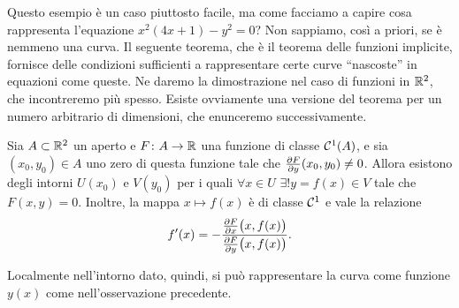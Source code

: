 Questo esempio è un caso piuttosto facile, ma come facciamo a capire cosa rappresenta l'equazione $x^2(4x+1)-y^2=0$?
Non sappiamo, così a priori, se è nemmeno una curva.
Il seguente teorema, che è il teorema delle funzioni implicite, fornisce delle condizioni sufficienti a rappresentare certe curve ``nascoste'' in equazioni come queste.
Ne daremo la dimostrazione nel caso di funzioni in $\mathbb{R}^2$, che incontreremo più spesso.
Esiste ovviamente una versione del teorema per un numero arbitrario di dimensioni, che enunceremo successivamente.
\begin{teorema}[di Dini] \label{t:dini-R2}
	Sia $A\subset\mathbb{R}^2$ un aperto e $F\colon A\to\mathbb{R}$ una funzione di classe $\mathcal{C}^{{1}}(A)$, e sia $(x_0,y_0)\in A$ uno zero di questa funzione tale che $\frac{\partial {F}}{\partial {y}}(x_0,y_0)\neq 0$.
	Allora esistono degli intorni $U(x_0)$ e $V(y_0)$ per i quali $\forall x\in U$ $\exists! y=f(x)\in V$ tale che $F(x,y)=0$. Inoltre, la mappa $x\mapsto f(x)$ è di classe $\mathcal{C}^{{1}}$ e vale la relazione
	\begin{equation}
		f'(x)=-\dfrac{\frac{\partial {F}}{\partial {x}}\big(x,f(x)\big)}{\frac{\partial {F}}{\partial {y}}\big(x,f(x)\big)}.
		\label{eq:dini-R2}
	\end{equation}
\end{teorema}
Localmente nell'intorno dato, quindi, si può rappresentare la curva come funzione $y(x)$ come nell'osservazione precedente.

